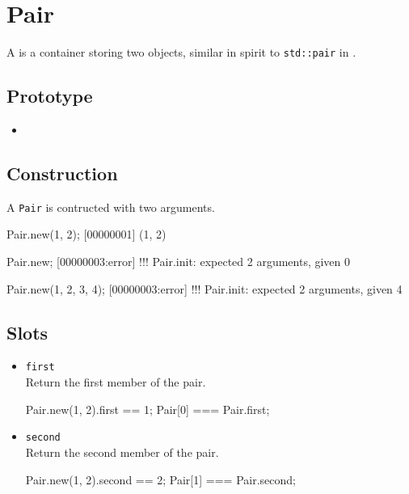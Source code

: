 \section{Pair}

A  is a container storing two objects, similar in spirit to
\lstinline|std::pair| in \Cxx.

\subsection{Prototype}
\begin{itemize}
\item {}
\end{itemize}

\subsection{Construction}

A \lstinline|Pair| is contructed with two arguments.

\begin{urbiscript}
Pair.new(1, 2);
[00000001] (1, 2)

Pair.new;
[00000003:error] !!! Pair.init: expected 2 arguments, given 0

Pair.new(1, 2, 3, 4);
[00000003:error] !!! Pair.init: expected 2 arguments, given 4
\end{urbiscript}

\subsection{Slots}
\begin{itemize}
\item \lstinline|first|\\
  Return the first member of the pair.
\begin{urbiassert}[firstnumber=last]
Pair.new(1, 2).first == 1;
Pair[0] === Pair.first;
\end{urbiassert}

\item \lstinline|second|\\
  Return the second member of the pair.
\begin{urbiassert}[firstnumber=last]
Pair.new(1, 2).second == 2;
Pair[1] === Pair.second;
\end{urbiassert}
\end{itemize}



